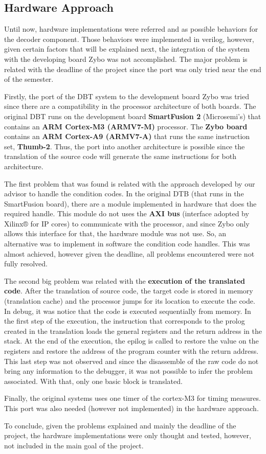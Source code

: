 \newpage
\subsection{Hardware Approach}

Until now, hardware implementations were referred and as possible behaviors for the decoder component. Those behaviors were implemented in verilog, however, given certain factors that will be explained next, the integration of the system with the developing board Zybo was not accomplished. The major problem is related with the deadline of the project since the port was only tried near the end of the semester.

Firstly, the port of the DBT system to the development board Zybo was tried since there are a compatibility in the processor architecture of both boards. The original DBT runs on the development board \textbf{SmartFusion 2} (Microsemi's) that contains an \textbf{ARM Cortex-M3 (ARMV7-M)} processor. The \textbf{Zybo board} contains an \textbf{ARM Cortex-A9 (ARMV7-A)} that runs the same instruction set, \textbf{Thumb-2}. Thus, the port into another architecture is possible since the translation of the source code will generate the same instructions for both architecture. 

The first problem that was found is related with the approach developed by our advisor to handle the condition codes. In the original DTB (that runs in the SmartFusion board), there are a module implemented in hardware that does the required handle. This module do not uses the \textbf{AXI bus} (interface adopted by Xilinx® for IP cores) to communicate with the processor, and since Zybo only allows this interface for that, the hardware module was not use. So, an alternative was to implement in software the condition code handles. This was almost achieved, however given the deadline, all problems encountered were not fully resolved.

The second big problem was related with the \textbf{execution of the translated code}. After the translation of source code, the target code is stored in memory (translation cache) and the processor jumps for its location to execute the code. In debug, it was notice that the code is executed sequentially from memory. In the first step of the execution, the instruction that corresponds to the prolog created in the translation loads the general registers and the return address in the stack. At the end of the execution, the epilog is called to restore the value on the registers and restore the address of the program counter with the return address. This last step was not observed and since the disassemble of the raw code do not bring any information to the debugger, it was not possible to infer the problem associated. With that, only one basic block is translated. 

Finally, the original systems uses one timer of the cortex-M3 for timing measures. This port was also needed (however not implemented) in the hardware approach.

To conclude, given the problems explained and mainly the deadline of the project, the hardware implementations were only thought and tested, however, not included in the main goal of the project.

